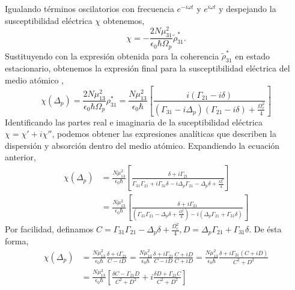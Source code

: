 Igualando términos oscilatorios con frecuencia $e^{-i \omega t}$ y $e^{i \omega t}$ y despejando la susceptibilidad eléctrica $\chi$ obtenemos,
\begin{equation}
    \chi = -\frac{2 N \mu_{31}^2}{\epsilon_0 \hbar \Omega_p} \tilde{\rho}_{31}^*.
\end{equation}
Sustituyendo con la expresión obtenida para la coherencia $\tilde{\rho}_{31}^*$ en estado estacionario, obtenemos la expresión final para la susceptibilidad eléctrica del medio atómico \cite{robertw.boydNonlinearOptics,harrisNonlinearOpticalProcesses1990,xiaoMeasurementDispersiveProperties1995},
\begin{equation}
\boxed{
    \chi(\Delta_p) = \frac{2 N \mu_{13}^2}{\epsilon_0 \hbar \Omega_p} \rho_{31}^* = \frac{N \mu_{13}^2}{\epsilon_0 \hbar} \left[ \frac{i (\Gamma_{21} - i\delta)}{(\Gamma_{31} - i\Delta_p)(\Gamma_{21} - i\delta) + \frac{\Omega_c^2}{4}}\right]
}
\label{eq:susceptibility}
\end{equation}
Identificando las partes real e imaginaria de la suceptibilidad eléctrica $\chi = \chi' + i \chi''$, podemos obtener las expresiones analíticas que describen la dispersión y absorción dentro del medio atómico. Expandiendo la ecuación anterior,
\begin{equation}
\begin{split}
    \chi(\Delta_p) &= \frac{N \mu_{13}^2}{\epsilon_0 \hbar} \left[ \frac{\delta + i\Gamma_{21}}{\Gamma_{31}\Gamma_{21} + i \Gamma_{31} \delta  - i\Delta_p \Gamma_{21} - \Delta_p \delta + \frac{\Omega_c^2}{4}}\right]\\
    &=\frac{N \mu_{13}^2}{\epsilon_0 \hbar} \left[ \frac{\delta + i\Gamma_{21}}{(\Gamma_{31}\Gamma_{21} - \Delta_p\delta + \frac{\Omega_c^2}{4}) - i(\Delta_p\Gamma_{21} + \Gamma_{31}\delta)}\right]
\end{split} 
\end{equation}
Por facilidad, definamos $C = \Gamma_{31}\Gamma_{21} - \Delta_p\delta + \frac{\Omega_c^2}{4}, D = \Delta_p\Gamma_{21} + \Gamma_{31}\delta$. De ésta forma,
\begin{equation}
    \begin{split}
        \chi(\Delta_p) &= \frac{N \mu_{13}^2}{\epsilon_0 \hbar} \frac{\delta + i\Gamma_{21}}{C - iD} =  \frac{N \mu_{13}^2}{\epsilon_0 \hbar} \frac{\delta + i\Gamma_{21}}{C - iD} \frac{C + iD}{C + iD} = \frac{N \mu_{13}^2}{\epsilon_0 \hbar} \frac{\delta + i\Gamma_{21}(C + iD)}{C^2 + D^2}\\
        &= \frac{N \mu_{13}^2}{\epsilon_0 \hbar} \left[\frac{\delta C - \Gamma_{21} D}{C^2 + D^2} + i \frac{\delta D + \Gamma_{21} C}{C^2 + D^2}\right]
    \end{split}
\end{equation}
